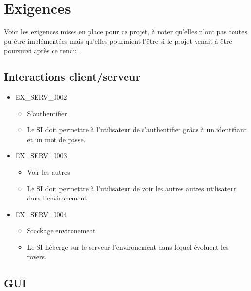 \documentclass[12pt,a4paper]{scrartcl}
\begin{document}
\section{Exigences}
Voici les exigences mises en place pour ce projet, à noter qu'elles n'ont pas toutes pu être implémentées
mais qu'elles pourraient l'être si le projet venait à être poursuivi après ce rendu.

\subsection{Interactions client/serveur}

\begin{itemize}

\item EX\_SERV\_0002
\begin{itemize}
\item S'authentifier
\item Le SI doit permettre à l'utilisateur de s'authentifier grâce à un
		identifiant et un mot de passe.
\end{itemize}


\item EX\_SERV\_0003
\begin{itemize}
\item Voir les autres
\item Le SI doit permettre à l'utilisateur de voir les autres autres
	utilisateur dans l'environement
\end{itemize}

\item EX\_SERV\_0004
\begin{itemize}
\item Stockage environement
\item Le SI héberge sur le serveur l'environement dans lequel évoluent les
	rovers.
\end{itemize}


\end{itemize}

\subsection{GUI}
\end{document}
